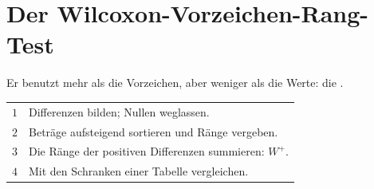\section{Der Wilcoxon-Vorzeichen-Rang-Test}

\begin{merksatz}
Er benutzt mehr als die Vorzeichen, aber weniger als die Werte: die .

\begin{center}
\renewcommand{\arraystretch}{1.5}
\begin{tabular}{@{}P{1.0cm}P{7.4cm}@{}}
\toprule
$1$ & Differenzen bilden; Nullen weglassen.\\
$2$ & Beträge aufsteigend sortieren und Ränge vergeben.\\
$3$ & Die Ränge der positiven Differenzen summieren: $W^+$.\\
$4$ & Mit den Schranken einer Tabelle vergleichen.\\
\bottomrule
\end{tabular}
\end{center}
\end{merksatz}

